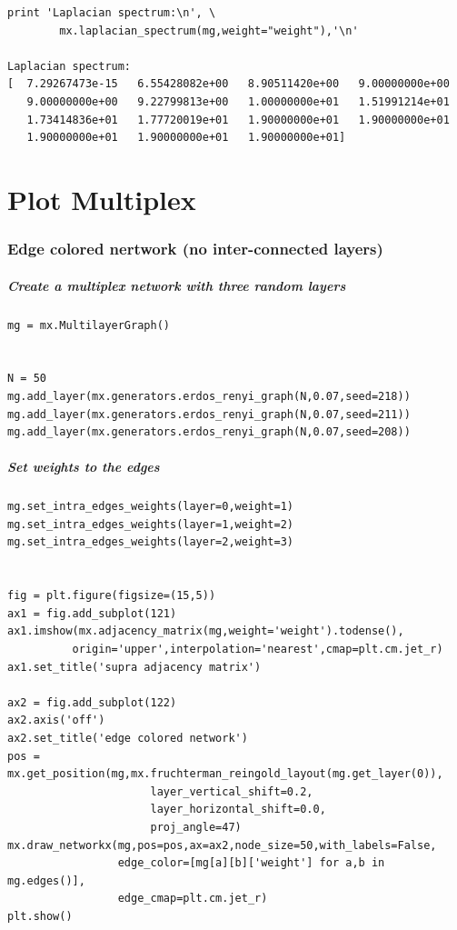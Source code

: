 \documentclass[11pt]{article}
\begin{document}
\begin{verbatim}
print 'Laplacian spectrum:\n', \
        mx.laplacian_spectrum(mg,weight="weight"),'\n'

Laplacian spectrum:
[  7.29267473e-15   6.55428082e+00   8.90511420e+00   9.00000000e+00
   9.00000000e+00   9.22799813e+00   1.00000000e+01   1.51991214e+01
   1.73414836e+01   1.77720019e+01   1.90000000e+01   1.90000000e+01
   1.90000000e+01   1.90000000e+01   1.90000000e+01] 
\end{verbatim}

\section{Plot Multiplex}\label{plot-multiplex}

\subsubsection{Edge colored nertwork (no inter-connected
layers)}\label{edge-colored-nertwork-no-inter-connected-layers}

\subparagraph{Create a multiplex network with three random
layers}\label{create-a-multiplex-network-with-three-random-layers}

\begin{verbatim}
mg = mx.MultilayerGraph()


N = 50
mg.add_layer(mx.generators.erdos_renyi_graph(N,0.07,seed=218))
mg.add_layer(mx.generators.erdos_renyi_graph(N,0.07,seed=211))
mg.add_layer(mx.generators.erdos_renyi_graph(N,0.07,seed=208))
\end{verbatim}

\subparagraph{Set weights to the edges}\label{set-weights-to-the-edges}

\begin{verbatim}
mg.set_intra_edges_weights(layer=0,weight=1)
mg.set_intra_edges_weights(layer=1,weight=2)
mg.set_intra_edges_weights(layer=2,weight=3)


fig = plt.figure(figsize=(15,5))
ax1 = fig.add_subplot(121)
ax1.imshow(mx.adjacency_matrix(mg,weight='weight').todense(),
          origin='upper',interpolation='nearest',cmap=plt.cm.jet_r)
ax1.set_title('supra adjacency matrix')

ax2 = fig.add_subplot(122)
ax2.axis('off')
ax2.set_title('edge colored network')
pos = mx.get_position(mg,mx.fruchterman_reingold_layout(mg.get_layer(0)),
                      layer_vertical_shift=0.2,
                      layer_horizontal_shift=0.0,
                      proj_angle=47)
mx.draw_networkx(mg,pos=pos,ax=ax2,node_size=50,with_labels=False,
                 edge_color=[mg[a][b]['weight'] for a,b in mg.edges()],
                 edge_cmap=plt.cm.jet_r)
plt.show()
\end{verbatim}
\end{document}
